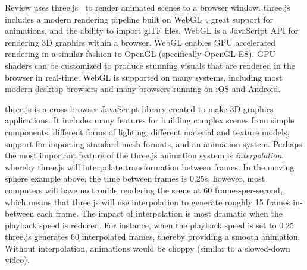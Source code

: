 Review uses three.js~\autocite{Cabello.2013.ThreeJS} to render animated scenes to a browser window.
%
three.js includes a modern rendering pipeline built on WebGL~\autocite{WebGL.2018}, great support for animations, and the ability to import glTF files.
%
WebGL is a JavaScript API for rendering 3D graphics within a browser. WebGL enables GPU accelerated rendering in a similar fashion to OpenGL (specifically OpenGL ES). GPU shaders can be customized to produce stunning visuals that are rendered in the browser in real-time.
%
WebGL is supported on many systems, including most modern desktop browsers and many browsers running on iOS and Android.


three.js is a cross-browser JavaScript library created to make 3D graphics applications.
%
It includes many features for building complex scenes from simple components: different forms of lighting, different material and texture models, support for importing standard mesh formats, and an animation system.
%
Perhaps the most important feature of the three.js animation system is \emph{interpolation}, whereby three.js will interpolate transformation between frames.
%
In the moving sphere example above, the time between frames is 0.25s, however, most computers will have no trouble rendering the scene at 60 frames-per-second, which means that three.js will use interpolation to generate roughly 15 frames in-between each frame.
%
The impact of interpolation is most dramatic when the playback speed is reduced. For instance, when the playback speed is set to 0.25 three.js generates 60 interpolated frames, thereby providing a smooth animation.
%
Without interpolation, animations would be choppy (similar to a slowed-down video).

